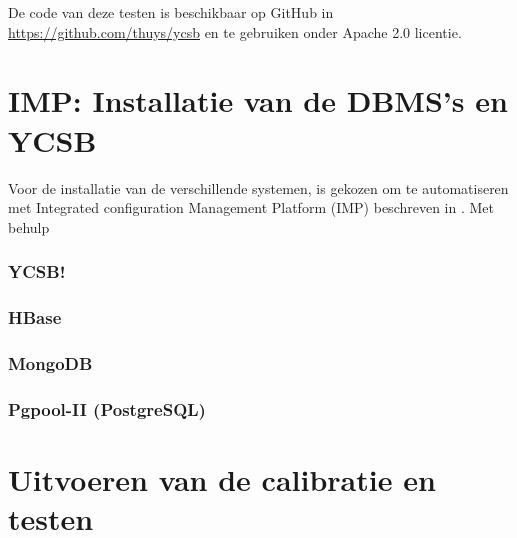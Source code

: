 De code van deze testen is beschikbaar op GitHub in \url{https://github.com/thuys/ycsb} en te gebruiken onder Apache 2.0 licentie. 

\section{IMP: Installatie van de DBMS's en YCSB}
Voor de installatie van de verschillende systemen, is gekozen om te automatiseren met Integrated configuration Management Platform (\gls{IMP}) beschreven in \cite{KULeuven-453199}. Met behulp 

\subsubsection{YCSB!}
\subsubsection{HBase}
\subsubsection{MongoDB}
\subsubsection{Pgpool-II (PostgreSQL)}

\section{Uitvoeren van de calibratie en testen}

